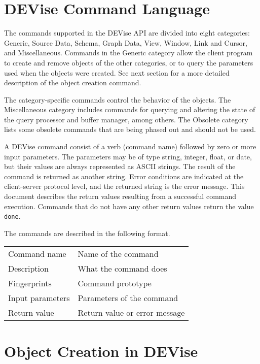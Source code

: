 \section{DEVise Command Language}

The commands supported in the DEVise API are divided into eight
categories: Generic, Source Data, Schema, Graph Data, View, Window,
Link and Cursor, and Miscellaneous. Commands in the Generic category
allow the client program to create and remove objects of the other
categories, or to query the parameters used when the objects were
created. See next section for a more detailed description
of the object creation command.

The category-specific commands control the behavior of the
objects. The Miscellaneous category includes commands for querying and
altering the state of the query processor and buffer manager, among
others. The Obsolete category lists some obsolete commands that are
being phased out and should not be used.

A DEVise command consist of a verb (command name) followed by zero or
more input parameters. The parameters may be of type string, integer,
float, or date, but their values are always represented as ASCII
strings. The result of the command is returned as another
string. Error conditions are indicated at the client-server protocol
level, and the returned string is the error message. This document
describes the return values resulting from a successful command
execution. Commands that do not have any other return values return
the value {\tt done}.

The commands are described in the following format.

\bigskip

\noindent
\begin{tabular}{l|p{5in}}
\hline
Command name & Name of the command \\
Description  & What the command does \\
Fingerprints & Command prototype \\
Input parameters & Parameters of the command \\
Return value & Return value or error message \\
\hline
\end{tabular}

\section{Object Creation in DEVise\protect\label{objcreate}}

